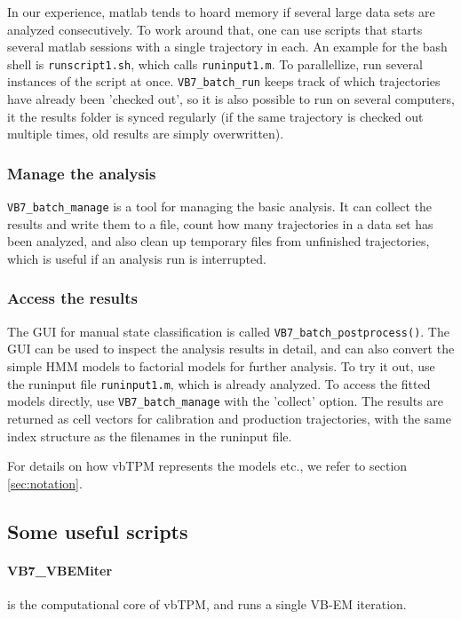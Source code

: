 In our experience, matlab tends to hoard memory if several large data
sets are analyzed consecutively.  To work around that, one can use
scripts that starts several matlab sessions with a single trajectory
in each. An example for the bash shell is \verb+runscript1.sh+, which
calls \verb+runinput1.m+. To parallellize, run several instances of
the script at once. \verb+VB7_batch_run+ keeps track of which
trajectories have already been 'checked out', so it is also possible
to run on several computers, it the results folder is synced regularly
(if the same trajectory is checked out multiple times, old results are
simply overwritten).


\subsubsection*{Manage the analysis}
\verb+VB7_batch_manage+ is a tool for managing the basic analysis. It
can collect the results and write them to a file, count how many
trajectories in a data set has been analyzed, and also clean up
temporary files from unfinished trajectories, which is useful if an
analysis run is interrupted.

\subsubsection*{Access the results} 
The GUI for manual state classification is called
\verb+VB7_batch_postprocess()+. The GUI can be used to inspect the
analysis results in detail, and can also convert the simple HMM models
to factorial models for further analysis. To try it out, use the
runinput file \verb+runinput1.m+, which is already analyzed. To access
the fitted models directly, use \verb+VB7_batch_manage+ with the
'collect' option. The results are returned as cell vectors for
calibration and production trajectories, with the same index structure
as the filenames in the runinput file.

For details on how vbTPM represents the models etc., we refer to
section \ref{sec:notation}.

\subsection{Some useful scripts}


\paragraph{VB7\_VBEMiter} 
is the computational core of vbTPM, and runs a single VB-EM iteration.
